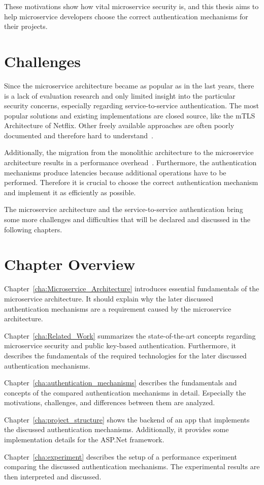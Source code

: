 These motivations show how vital microservice security is, and this thesis aims to help microservice developers choose the correct authentication mechanisms for their projects.

\section{Challenges}
Since the microservice architecture became as popular as in the last years, there is a lack of evaluation research and only limited insight into the particular security concerns, especially regarding service-to-service authentication. 
The most popular solutions and existing implementations are closed source, like the mTLS Architecture of Netflix.
Other freely available approaches are often poorly documented and therefore hard to understand~\cite{yarygina2018overcoming}.

Additionally, the migration from the monolithic architecture to the microservice architecture results in a performance overhead~\cite{ueda2016workload}.
Furthermore, the authentication mechanisms produce latencies because additional operations have to be performed.
Therefore it is crucial to choose the correct authentication mechanism and implement it as efficiently as possible.

The microservice architecture and the service-to-service authentication bring some more challenges and difficulties that will be declared and discussed in the following chapters.

\section{Chapter Overview}
Chapter~\ref{cha:Microservice_Architecture} introduces essential fundamentals of the microservice architecture. 
It should explain why the later discussed authentication mechanisms are a requirement caused by the microservice architecture.

\noindent Chapter~\ref{cha:Related_Work} summarizes the state-of-the-art concepts regarding microservice security and public key-based authentication.
Furthermore, it describes the fundamentals of the required technologies for the later discussed authentication mechanisms.

\noindent Chapter~\ref{cha:authentication_mechanisms} describes the fundamentals and concepts of the compared authentication mechanisms in detail.
Especially the motivations, challenges, and differences between them are analyzed.

\noindent Chapter~\ref{cha:project_structure} shows the backend of an app that implements the discussed authentication mechanisms.
Additionally, it provides some implementation details for the ASP.Net framework.

\noindent Chapter~\ref{cha:experiment} describes the setup of a performance experiment comparing the discussed authentication mechanisms.
The experimental results are then interpreted and discussed.
